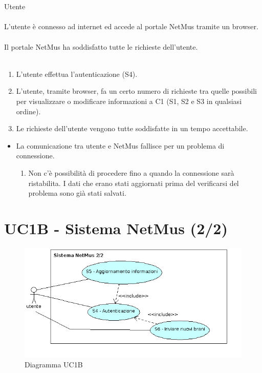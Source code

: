 \vspace*{0.5cm}
\\\\
 Utente \\\\
 L'utente \`e connesso ad internet ed accede al portale
NetMus tramite un browser. \\\\ 
 Il portale NetMus ha soddisfatto tutte le richieste
dell'utente. \\\\ 
\begin{enumerate}
  \item L'utente effettua l'autenticazione (S4).
  \item L'utente, tramite browser, fa un certo numero di richieste tra quelle
  possibili per visualizzare o modificare informazioni a C1 (S1, S2 e S3 in
  qualsiasi ordine).
  \item Le richieste dell'utente vengono tutte soddisfatte in un tempo
  accettabile.
\end{enumerate}
\begin{itemize}
  \item La comunicazione tra utente e NetMus fallisce per un problema di
  connessione.
  \begin {enumerate}
    \item Non c'\`e possibilit\`a di procedere fino a quando la connessione sar\`a
    ristabilita. I dati che erano stati aggiornati prima del verificarsi del
    problema sono gi\`a stati salvati.
  \end{enumerate}
\end{itemize}
\newpage

\section{UC1B - Sistema NetMus (2/2)}

\begin{figure}[h]
  \centering
  \includegraphics[width=13cm]{img/AR/UC1B.png}
\caption{Diagramma UC1B}
\end{figure}

